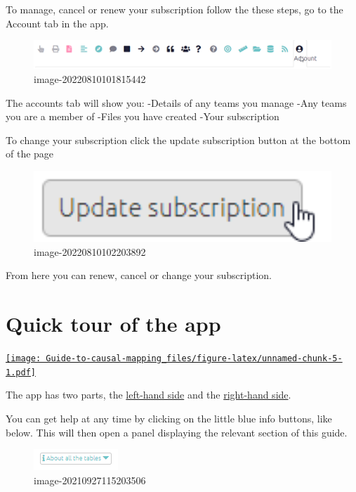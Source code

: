 \documentclass[
]{book}
\begin{document}
To manage, cancel or renew your subscription follow the these steps, go to the Account tab in the app.

\begin{figure}
\centering
\includegraphics[width=6.77083in,height=\textheight]{_assets/image-20220810101815442.png}
\caption{image-20220810101815442}
\end{figure}

The accounts tab will show you:
-Details of any teams you manage
-Any teams you are a member of
-Files you have created
-Your subscription

To change your subscription click the update subscription button at the bottom of the page

\begin{figure}
\centering
\includegraphics[width=6.77083in,height=\textheight]{_assets/image-20220810102203892.png}
\caption{image-20220810102203892}
\end{figure}

From here you can renew, cancel or change your subscription.

\hypertarget{quick-tour}{%
\chapter{Quick tour of the app}\label{quick-tour}}

\href{https://player.vimeo.com/video/674369121}{\texttt{[image: Guide-to-causal-mapping\_files/figure-latex/unnamed-chunk-5-1.pdf]}}

The app has two parts, the \protect\hyperlink{xlhs}{left-hand side} and the \protect\hyperlink{rhs}{right-hand side}.

You can get help at any time by clicking on the little blue info buttons, like below. This will then open a panel displaying the relevant section of this guide.

\begin{figure}
\centering
\includegraphics{_assets/image-20210927115203506.png}
\caption{image-20210927115203506}
\end{figure}
\end{document}
